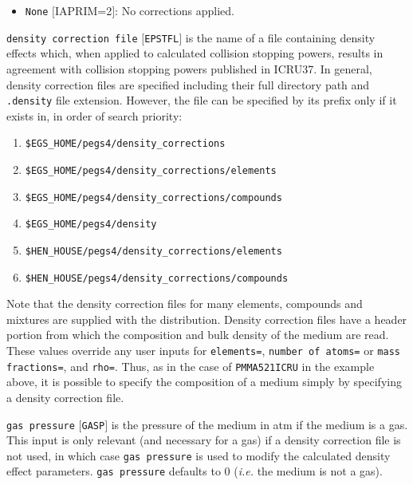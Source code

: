 \documentclass[12pt,twoside]{article}  %
\begin{document}
\begin{description}
\begin{description}
\begin{itemize}
{\tt \$HEN\_HOUSE/pegs4/aprime.data}.
\item {\tt None} $[$IAPRIM=2$]$: No corrections applied.
\end{itemize}
\item {\tt density correction file} $[${\tt EPSTFL}$]$ is the name of a file containing density effects which, when applied to calculated collision
stopping powers, results in agreement with collision stopping powers published in ICRU37\cite{ICRU37}.  In general, density correction files are specified including their full directory path and {\tt .density} file extension.  However,
the file can be specified by its prefix only if it
exists in, in order of search priority:
\begin{enumerate}
\item {\tt \$EGS\_HOME/pegs4/density\_corrections}
\item {\tt \$EGS\_HOME/pegs4/density\_corrections/elements}
\item {\tt \$EGS\_HOME/pegs4/density\_corrections/compounds}
\item {\tt \$EGS\_HOME/pegs4/density}
\item {\tt \$HEN\_HOUSE/pegs4/density\_corrections/elements}
\item {\tt \$HEN\_HOUSE/pegs4/density\_corrections/compounds}
\end{enumerate}
Note that the density correction files for many elements, compounds
and mixtures are supplied with
the distribution.  Density correction files have a header portion from which the composition and bulk density of the medium are read.  These values override
any user inputs for {\tt elements=}, {\tt number of atoms=} or {\tt mass fractions=}, and {\tt rho=}.  Thus, as in the case of
{\tt PMMA521ICRU} in the example above, it is possible to specify the composition
of a medium simply by specifying a density correction file.
\item {\tt gas pressure} $[${\tt GASP}$]$ is the pressure of the medium in atm
if the medium is a gas.  This input is only relevant (and necessary
for a gas) if
a density correction file is not used, in which case {\tt gas pressure} is used to modify the calculated density effect parameters.
{\tt gas pressure} defaults to 0 ({\em i.e.} the medium is not a gas).
\end{description}
\end{description}
\end{document}
